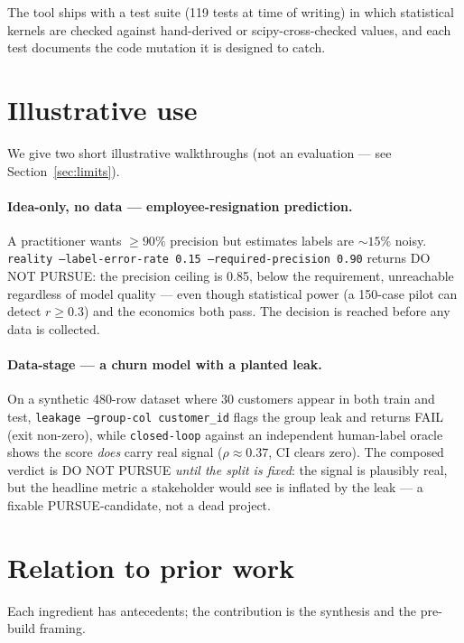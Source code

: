\documentclass[11pt]{article}
\begin{document}
The tool ships with a test suite (119 tests at time of writing) in which statistical kernels are
checked against hand-derived or scipy-cross-checked values, and each test documents the code mutation
it is designed to catch.

\section{Illustrative use}
\label{sec:illustrative}

We give two short illustrative walkthroughs (not an evaluation --- see Section~\ref{sec:limits}).

\paragraph{Idea-only, no data --- employee-resignation prediction.} A practitioner wants $\geq 90\%$
precision but estimates labels are $\sim 15\%$ noisy. \texttt{reality --label-error-rate 0.15
--required-precision 0.90} returns DO NOT PURSUE: the precision ceiling is 0.85, below the
requirement, unreachable regardless of model quality --- even though statistical power (a 150-case
pilot can detect $r \geq 0.3$) and the economics both pass. The decision is reached before any data
is collected.

\paragraph{Data-stage --- a churn model with a planted leak.} On a synthetic 480-row dataset where 30
customers appear in both train and test, \texttt{leakage --group-col customer\_id} flags the group
leak and returns FAIL (exit non-zero), while \texttt{closed-loop} against an independent human-label
oracle shows the score \emph{does} carry real signal ($\rho \approx 0.37$, CI clears zero). The
composed verdict is DO NOT PURSUE \emph{until the split is fixed}: the signal is plausibly real, but
the headline metric a stakeholder would see is inflated by the leak --- a fixable PURSUE-candidate,
not a dead project.

\section{Relation to prior work}
\label{sec:related}

Each ingredient has antecedents; the contribution is the synthesis and the pre-build framing.
\end{document}
